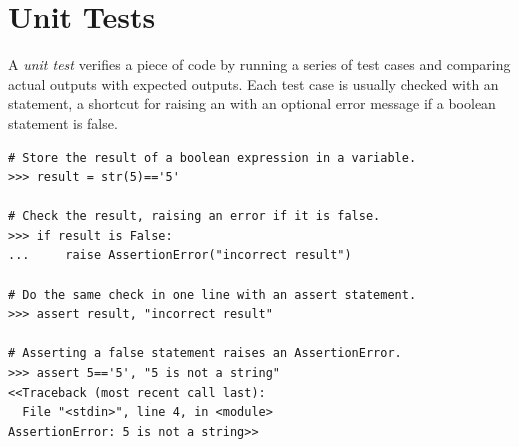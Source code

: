 \label{lab:PythonEssentials:Testing}


\section*{Unit Tests} %

A \emph{unit test} verifies a piece of code by running a series of test cases and comparing actual outputs with expected outputs.
Each test case is usually checked with an  statement, a shortcut for raising an  with an optional error message if a boolean statement is false.

\begin{lstlisting}
# Store the result of a boolean expression in a variable.
>>> result = str(5)=='5'

# Check the result, raising an error if it is false.
>>> if result is False:
...     raise AssertionError("incorrect result")

# Do the same check in one line with an assert statement.
>>> assert result, "incorrect result"

# Asserting a false statement raises an AssertionError.
>>> assert 5=='5', "5 is not a string"
<<Traceback (most recent call last):
  File "<stdin>", line 4, in <module>
AssertionError: 5 is not a string>>
\end{lstlisting}

